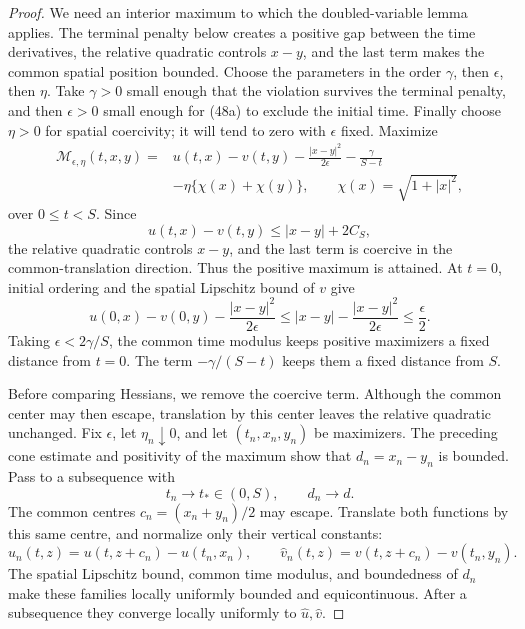 \documentclass{aomart}
\theoremstyle{definition}
\newcommand{\1}{\mathbf 1}
\begin{document}
\begin{proof}
We need an interior maximum to which the doubled-variable lemma
applies.  The terminal penalty below creates a positive gap between
the time derivatives, the relative quadratic controls $x-y$, and the
last term makes the common spatial position bounded.
Choose the parameters in the order $\gamma$, then $\epsilon$, then
$\eta$.  Take $\gamma>0$ small enough that the violation survives
the terminal penalty, and then $\epsilon>0$ small enough for (48a)
to exclude the initial time.  Finally choose $\eta>0$ for spatial
coercivity; it will tend to zero with $\epsilon$ fixed.  Maximize
\begin{equation}
\begin{split}
\mathcal M_ {\epsilon,\eta}(t,x,y)
={}&u(t,x)-v(t,y)-\frac{|x-y|^2}{2\epsilon}
-\frac{\gamma}{S-t}\\
&-\eta\{\chi(x)+\chi(y)\},\qquad
\chi(x)=\sqrt{1+|x|^2},                                  
\end{split}
\tag{48}
\end{equation}
over $0\leq t<S$.  Since
\begin{equation*}
u(t,x)-v(t,y)\leq |x-y|+2C_ S,
\end{equation*}
the relative quadratic controls $x-y$, and the last term is
coercive in the common-translation direction.  Thus the positive
maximum is attained.  At $t=0$, initial ordering and the spatial
Lipschitz bound of $v$ give
\begin{equation}
u(0,x)-v(0,y)-\frac{|x-y|^2}{2\epsilon}
\leq |x-y|-\frac{|x-y|^2}{2\epsilon}\leq\frac\epsilon2.
\tag{48a}
\end{equation}
Taking $\epsilon<2\gamma/S$, the common time modulus keeps positive
maximizers a fixed distance from $t=0$.  The term
$-\gamma/(S-t)$ keeps them a fixed distance from $S$.

Before comparing Hessians, we remove the coercive term.  Although
the common center may then escape, translation by this center leaves
the relative quadratic unchanged.  Fix $\epsilon$, let
$\eta_n\downarrow0$, and let
$(t_ n,x_ n,y_ n)$ be maximizers.  The preceding cone estimate and
positivity of the maximum show that $d_ n=x_ n-y_ n$ is bounded.  Pass
to a subsequence with
\begin{equation*}
t_ n\to t_ *\in(0,S),\qquad d_ n\to d.
\end{equation*}
The common centres $c_ n=(x_ n+y_ n)/2$ may escape.  Translate both
functions by this same centre, and normalize only their vertical
constants:
\begin{equation}
\widehat u_ n(t,z)=u(t,z+c_ n)-u(t_ n,x_ n),\qquad
\widehat v_ n(t,z)=v(t,z+c_ n)-v(t_ n,y_ n).
\tag{48b}
\end{equation}
The spatial Lipschitz bound, common time modulus, and boundedness of
$d_ n$ make these families locally uniformly bounded and
equicontinuous.  After a subsequence they converge locally uniformly
to $\widehat u,\widehat v$.


\end{proof}
\end{document}
